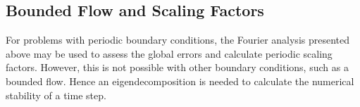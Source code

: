 \documentclass[conf]{new-aiaa}
\begin{document}
\subsection{Bounded Flow and Scaling Factors}
\label{subsec:Bounded_Scaling}
For problems with periodic boundary conditions, the Fourier analysis presented above may be used to assess the global errors and calculate periodic scaling factors. 
However, this is not possible with other boundary conditions, such as a bounded flow. 
Hence an eigendecomposition is needed to calculate the numerical stability of a time step. 
\end{document}

